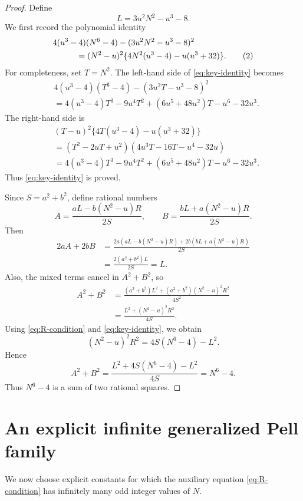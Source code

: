 \documentclass[11pt]{article}
\theoremstyle{remark}
\begin{document}
\begin{proof}
Define
\[
        L=3u^2N^2-u^3-8.
\]
We first record the polynomial identity
\begin{align}
&4(u^3-4)(N^6-4)-(3u^2N^2-u^3-8)^2       \notag\\
&\hspace{1cm}=(N^2-u)^2\{4N^2(u^3-4)-u(u^3+32)\}.        \tag{2}\label{eq:key-identity}
\end{align}
For completeness, set \(T=N^2\).  The left-hand side of \eqref{eq:key-identity}
becomes
\begin{align*}
&4(u^3-4)(T^3-4)-(3u^2T-u^3-8)^2 \\
&=4(u^3-4)T^3-9u^4T^2+(6u^5+48u^2)T-u^6-32u^3.
\end{align*}
The right-hand side is
\begin{align*}
&(T-u)^2\{4T(u^3-4)-u(u^3+32)\} \\
&=(T^2-2uT+u^2)(4u^3T-16T-u^4-32u) \\
&=4(u^3-4)T^3-9u^4T^2+(6u^5+48u^2)T-u^6-32u^3.
\end{align*}
Thus \eqref{eq:key-identity} is proved.

Since \(S=a^2+b^2\), define rational numbers
\[
        A=\frac{aL-b(N^2-u)R}{2S},
        \qquad
        B=\frac{bL+a(N^2-u)R}{2S}.
\]
Then
\begin{align*}
        2aA+2bB
        &=\frac{2a(aL-b(N^2-u)R)+2b(bL+a(N^2-u)R)}{2S} \\
        &=\frac{2(a^2+b^2)L}{2S}=L.
\end{align*}
Also, the mixed terms cancel in \(A^2+B^2\), so
\begin{align*}
        A^2+B^2
        &=\frac{(a^2+b^2)L^2+(a^2+b^2)(N^2-u)^2R^2}{4S^2} \\
        &=\frac{L^2+(N^2-u)^2R^2}{4S}.
\end{align*}
Using \eqref{eq:R-condition} and \eqref{eq:key-identity}, we obtain
\[
        (N^2-u)^2R^2=4S(N^6-4)-L^2.
\]
Hence
\[
        A^2+B^2
        =\frac{L^2+4S(N^6-4)-L^2}{4S}
        =N^6-4.
\]
Thus \(N^6-4\) is a sum of two rational squares.
\end{proof}

\section{An explicit infinite generalized Pell family}

We now choose explicit constants for which the auxiliary equation
\eqref{eq:R-condition} has infinitely many odd integer values of \(N\).
\end{document}
